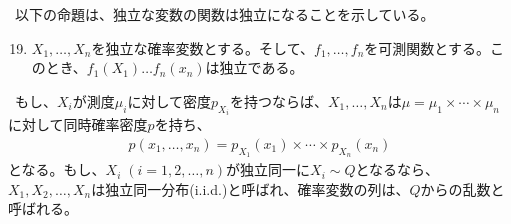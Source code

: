 \documentclass[a4j,12pt]{jarticle}
\begin{document}
\ 以下の命題は、独立な変数の関数は独立になることを示している。
\begin{enumerate}[label = 命題1.\*arabic]
\setcounter{enumi}{18}
\item $X_{1},\ldots,X_{n}$を独立な確率変数とする。そして、$f_{1},\ldots,f_{n}$を可測関数とする。このとき、$f_{1}(X_{1}) \ldots f_{n}(x_{n})$は独立である。
\end{enumerate}
\ もし、$X_{i}$が測度$\mu_{i}$に対して密度$p_{X_{i}}$を持つならば、$X_{1},\ldots,X_{n}$は$\mu = \mu_{1}×\cdots × \mu_{n}$に対して同時確率密度$p$を持ち、
\begin{align*}
p(x_{1},\ldots,x_{n}) = p_{X_{1}}(x_{1})×\cdots × p_{X_{n}}(x_{n})
\end{align*}
となる。もし、$X_{i} \; (i = 1,2,\ldots,n)$が独立同一に$X_{i} \sim Q$となるなら、$X_{1},X_{2},\ldots,X_{n}$は独立同一分布(i.i.d.)と呼ばれ、確率変数の列は、$Q$からの乱数と呼ばれる。
\end{document}
